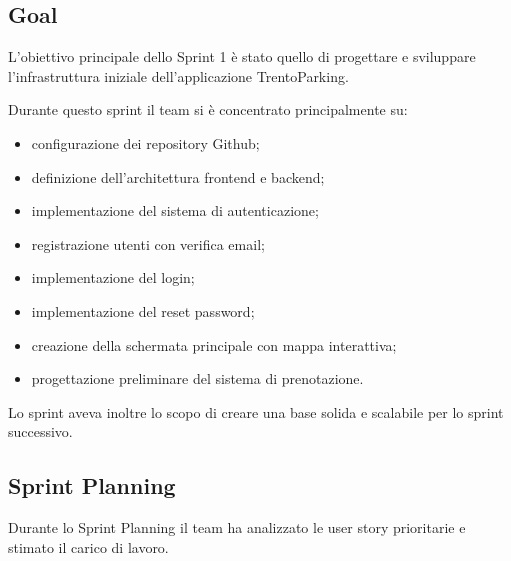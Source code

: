 \documentclass[12pt,a4paper]{article}
\renewcommand{\arraystretch}{1.3}
\begin{document}
\subsection{Goal}

L'obiettivo principale dello Sprint 1 è stato quello di progettare e sviluppare l'infrastruttura iniziale dell'applicazione TrentoParking.

Durante questo sprint il team si è concentrato principalmente su:

\begin{itemize}
    \item configurazione dei repository Github;
    \item definizione dell'architettura frontend e backend;
    \item implementazione del sistema di autenticazione;
    \item registrazione utenti con verifica email;
    \item implementazione del login;
    \item implementazione del reset password;
    \item creazione della schermata principale con mappa interattiva;
    \item progettazione preliminare del sistema di prenotazione.
\end{itemize}

Lo sprint aveva inoltre lo scopo di creare una base solida e scalabile per lo sprint successivo.

\subsection{Sprint Planning}

Durante lo Sprint Planning il team ha analizzato le user story prioritarie e stimato il carico di lavoro.

\small

\renewcommand{\arraystretch}{1.25}

\setlength{\LTleft}{0pt}
\setlength{\LTright}{0pt}
\end{document}
